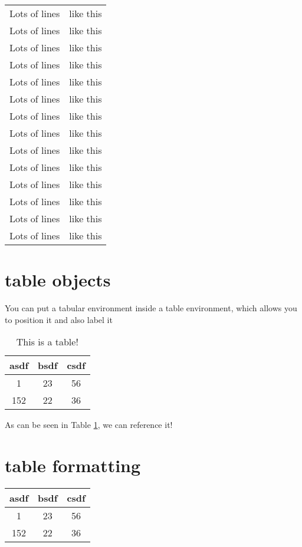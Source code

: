 \documentclass[12pt]{report}
\begin{document}
\begin{longtable}[c]{|c | c |}
  Lots of lines & like this\\
 Lots of lines & like this\\
 Lots of lines & like this\\
 Lots of lines & like this\\
 Lots of lines & like this\\
 Lots of lines & like this\\
 Lots of lines & like this\\
  Lots of lines & like this\\
 Lots of lines & like this\\
 Lots of lines & like this\\
 Lots of lines & like this\\
 Lots of lines & like this\\
 Lots of lines & like this\\
 Lots of lines & like this\\
 \end{longtable}

 \section{table objects}
 You can put a tabular environment inside a table environment, which allows you to position it and also label it 

 \begin{table}[h!]
    \centering
    \begin{tabular}{||| c | c | c ||} %
        \hline 
        asdf & bsdf & csdf \\
        \hline \hline 
        1 & 23 & 56 \\
        \hline 
        152 & 22 & 36 \\
        \hline 
    \end{tabular}
    \caption{This is a table!}
    \label{table1}
\end{table}

As can be seen in Table \ref{table1}, we can reference it!

\section{table formatting}
\setlength{\arrayrulewidth}{0.5mm} %
\setlength{\tabcolsep}{18pt} %
\renewcommand{\arraystretch}{1.5} %


\begin{center}
    \begin{tabular}{| c | c | c |} %
        \hline 
        asdf & bsdf & csdf \\
        \hline \hline 
        1 & 23 & 56 \\
        \hline 
        152 & 22 & 36 \\
        \hline 
    \end{tabular}
\end{center}
\end{document}
